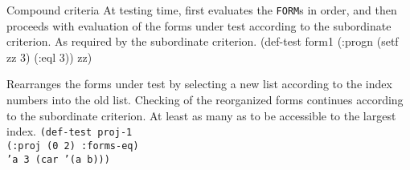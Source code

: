 \begin{criteriaGroup}{Compound criteria}{}
{At testing time, first evaluates the \texttt{FORM}s in order, and
  then proceeds with evaluation of the forms under test according to
  the subordinate criterion.}
{As required by the subordinate criterion.}
{\noExpl}
{\singleEx}
{(def-test form1 (:progn (setf zz 3) (:eql 3)) zz)}

{Rearranges the forms under test by selecting a new list according to
  the index numbers into the old list.  Checking of the reorganized
  forms continues according to the subordinate criterion.}
{At least as many as to be accessible to the largest index.}
{}
{\tabbingEx}
{\texttt{(d}\=\texttt{ef}\=\texttt{-test proj-1}
\\ \>\> \texttt{(:proj (0 2) :forms-eq)}
\\ \> \texttt{'a 3 (car '(a b)))}}

\end{criteriaGroup}

